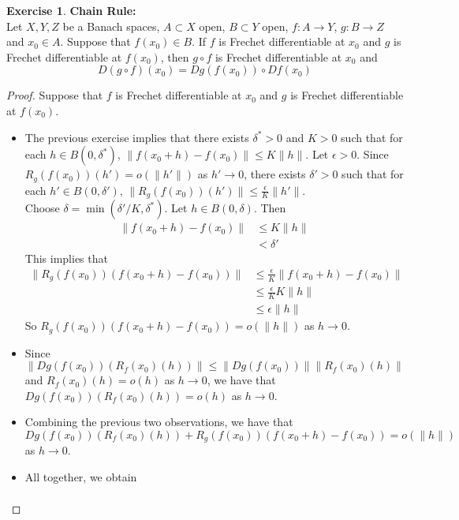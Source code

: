 \documentclass[12pt]{amsart}
\theoremstyle{definition}
\newtheorem{ex}[definition]{Exercise}
\newcommand{\del}{\delta}
\newcommand{\ep}{\epsilon}
\newcommand{\tbf}[1]{\textbf{#1}}
\DeclareMathOperator*{\0}{\mbf{0}}
\DeclareMathOperator*{\1}{\mbf{1}}
\newcommand{\lex}[1]{\label{ex:#1}}
\begin{document}
	\begin{ex} \lex{62009}\tbf{Chain Rule:}\\
	Let $X, Y, Z$ be a Banach spaces, $A \subset X$ open, $B \subset Y$ open, $f:A \rightarrow Y$, $g:B \rightarrow Z$ and $x_0 \in A$. Suppose that $f(x_0) \in B$. If $f$ is Frechet differentiable at $x_0$ and $g$ is Frechet differentiable at $f(x_0)$, then $g \circ f$ is Frechet differentiable at $x_0$ and $$D(g \circ f)(x_0) = Dg(f(x_0)) \circ Df(x_0)$$
	\end{ex}
	
	\begin{proof}
	Suppose that $f$ is Frechet differentiable at $x_0$ and $g$ is Frechet differentiable at $f(x_0)$. 
	
	\begin{itemize}
	\item The previous exercise implies that there exists $\del^* >0$ and $K > 0$ such that for each $h \in B(0, \del^*)$, $\| f(x_0 + h) - f(x_0) \| \leq K \|h\|$. Let $\ep >0$. Since $R_g(f(x_0))(h') = o(\|h'\|)$ as $h' \rightarrow 0$, there exists $\del' >0$ such that for each $h' \in B(0, \del')$, $\|R_g(f(x_0))(h')\| \leq \frac{\ep}{K} \|h'\|$. \\ Choose $\del = \min(\del' / K, \del^*)$. Let $h \in B(0, \del)$. Then 
	\begin{align*}
	\| f(x_0 + h) - f(x_0) \| 
	& \leq K \|h\| \\
	&< \del' 
	\end{align*}
	This implies that 
	\begin{align*}
	\|R_g(f(x_0))(f(x_0 + h) - f(x_0))\| 
	& \leq \frac{\ep}{K} \|f(x_0 + h) - f(x_0)\| \\
	& \leq \frac{\ep}{K} K\|h\| \\
	& \leq \ep \|h\|
	\end{align*}
	So $R_g(f(x_0))(f(x_0 + h) - f(x_0)) = o(\|h\|)$ as $h \rightarrow 0$. \\
	\item Since $\|Dg(f(x_0))(R_f(x_0)(h))\| \leq \|Dg(f(x_0)) \| \|R_f(x_0)(h)\|$ and $R_f(x_0)(h) = o(h)$ as $h \rightarrow 0$, we have that $Dg(f(x_0))(R_f(x_0)(h)) = o(h)$ as $h \rightarrow 0$. \\
	\item Combining the previous two observations, we have that $Dg(f(x_0))(R_f(x_0)(h)) + R_g(f(x_0))(f(x_0 + h) - f(x_0)) = o(\|h\|)$ as $h \rightarrow 0$. \\
	\item All together, we obtain 
	\begin{align*}

\end{align*}
\end{itemize}
\end{proof}
\end{document}

